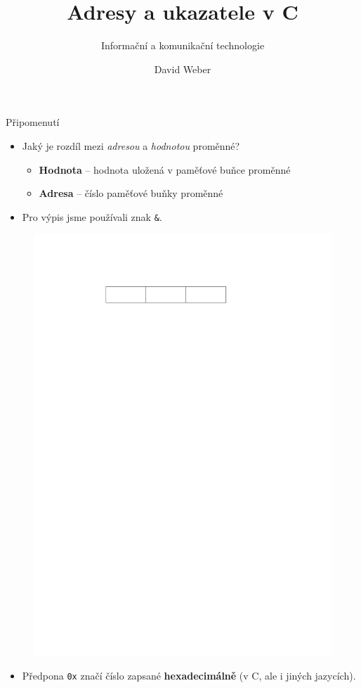 \documentclass[14pt,aspectratio=169]{beamer}
\title{Adresy a ukazatele v C}
\subtitle{Informační a komunikační technologie}
\author{David Weber}
\begin{document}

    \begin{frame}
        \titlepage
    \end{frame}

    \begin{frame}[t]{Připomenutí}
        \begin{itemize}
            \item Jaký je rozdíl mezi \emph{adresou} a \emph{hodnotou} proměnné?
            \begin{itemize}
                \item \textbf{Hodnota} -- hodnota uložená v paměťové buňce proměnné
                \item \textbf{Adresa} -- číslo paměťové buňky proměnné
            \end{itemize}
            \item Pro výpis jsme používali znak \texttt{\&}.
        \end{itemize}
        \begin{figure}
            \centering
            \includegraphics{images/memory_variable.pdf}
        \end{figure}
        \begin{itemize}
            \item Předpona \texttt{0x} značí číslo zapsané \textbf{hexadecimálně} (v C, ale i jiných jazycích).
        \end{itemize}
    \end{frame}
\end{document}
